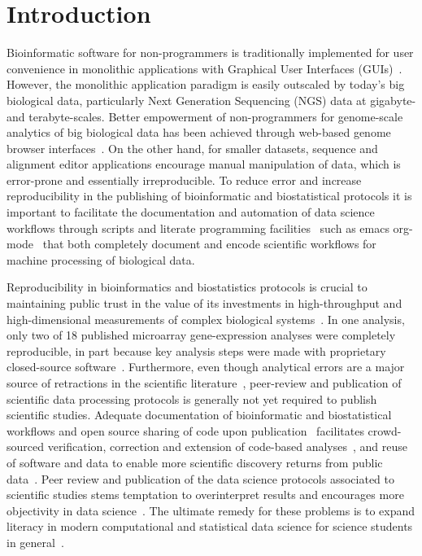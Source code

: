 \documentclass{frontiersSCNS} %
\begin{document}
\section{Introduction}

Bioinformatic software for non-programmers is traditionally
implemented for user convenience in monolithic applications with
Graphical User Interfaces
(GUIs)~\citep{Smith1994,stothard_sequence_2000,Rampp2006,
  Librado01062009,waterhouse_jalview_2009,gouy2010seaview}.  However,
the monolithic application paradigm is easily outscaled by today's big
biological data, particularly Next Generation Sequencing (NGS) data at
gigabyte- and terabyte-scales. Better empowerment of non-programmers
for genome-scale analytics of big biological data has been achieved
through web-based genome browser
interfaces~\citep{Cunningham28012015,Rosenbloom28012015,Markowitz01012014}. On
the other hand, for smaller datasets, sequence and alignment editor
applications encourage manual manipulation of data, which is
error-prone and essentially irreproducible. To reduce error and
increase reproducibility in the publishing of bioinformatic and
biostatistical protocols it is important to facilitate the
documentation and automation of data science workflows through scripts
and literate programming facilities~\citep{knuth1984literate} such as
emacs org-mode~\citep[\url{http://orgmode.org}, as demonstrated in, for example][]{delescluse_making_2012} that both completely
document and encode scientific workflows for machine processing of
biological data.

Reproducibility in bioinformatics and biostatistics protocols is
crucial to maintaining public trust in the value of its investments in
high-throughput and high-dimensional measurements of complex
biological
systems~\citep{BaggerlyCoombes2009,hutson2010data,Baggerly01052011,Huang01072013}.
In one analysis, only two of 18 published microarray gene-expression
analyses were completely reproducible, in part because key analysis
steps were made with proprietary closed-source
software~\citep{Ioannidis:2008cr}. Furthermore, even though analytical
errors are a major source of retractions in the scientific
literature~\citep{Casadevall01092014}, peer-review and publication of
scientific data processing protocols is generally not yet required to
publish scientific studies.  Adequate documentation of bioinformatic
and biostatistical workflows and open source sharing of code upon
publication~\citep{Peng01072009} facilitates crowd-sourced
verification, correction and extension of code-based
analyses~\citep{barnes2010publish,Morin13042012}, and reuse of
software and data to enable more scientific discovery returns from
public data~\citep{Peng02122011}. Peer review and publication of the
data science protocols associated to scientific studies stems
temptation to overinterpret results and encourages more objectivity in
data science~\citep{Boulesteix01022010}. The ultimate remedy for these
problems is to expand literacy in modern computational and statistical
data science for science students in
general~\citep{Morin13042012,Joppa17052013}.
\end{document}
